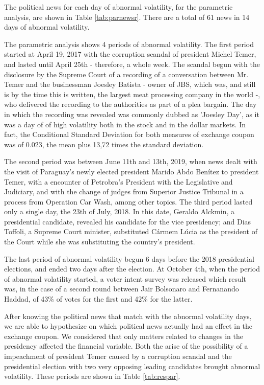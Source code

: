 \documentclass[a4paper]{article}
\begin{document}
The political news for each day of abnormal volatility, for the parametric analysis, are shown in Table \ref{tab:parnewsr}. There are a total of 61 news in 14 days of abnormal volatility.



The parametric analysis shows 4 periods of abnormal volatility. The first period started at April 19, 2017 with the corruption scandal of president Michel Temer, and lasted until April 25th - therefore, a whole week. The scandal begun with the disclosure by the Supreme Court of a recording of a conversation between Mr. Temer and the businessman Joesley Batista - owner of JBS, which was, and still is by the time this is written, the largest meat processing company in the world -, who delivered the recording to the authorities as part of a plea bargain. The day in which the recording was revealed was commonly dubbed as 'Joesley Day', as it was a day of of high volatility both in the stock and in the dollar markets. In fact, the Conditional Standard Deviation for both measures of exchange coupon was of 0.023, the mean plus 13,72 times the standard deviation.

The second period was between June 11th and 13th, 2019, when news dealt with the visit of Paraguay's newly elected president Marido Abdo Benítez to president Temer, with a encounter of Petrobra's President with the Legislative and Judiciary, and with the change of judges from Superior Justice Tribunal in a process from Operation Car Wash, among other topics. The third period lasted only a single day, the 23th of July, 2018. In this date, Geraldo Alckmin, a presidential candidate, revealed his candidate for the vice presidency; and Dias Toffoli, a Supreme Court minister, substituted Cármem Lúcia as the president of the Court while she was substituting the country's president.

The last period of abnormal volatility begun 6 days before the 2018 presidential elections, and ended two days after the election. At October 4th, when the period of abnormal volatility started, a voter intent survey was released which result was, in the case of a second round between Jair Bolsonaro and Fernanando Haddad, of 43\% of votes for the first and 42\% for the latter. 

After knowing the political news that match with the abnormal volatility days, we are able to hypothesize on which political news actually had an effect in the exchange coupon. We considered that only matters related to changes in the presidency affected the financial variable. Both the arise of the possibility of a impeachment of president Temer caused by a corruption scandal and the presidential election with two very opposing leading candidates brought abnormal volatility. These periods are shown in Table \ref{tab:respar}.
\end{document}
